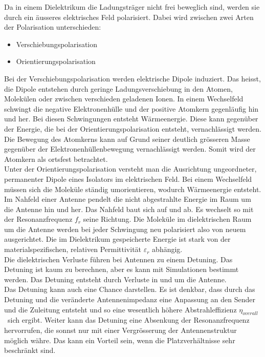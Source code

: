 Da in einem Dielektrikum die Ladungsträger nicht frei beweglich sind, werden sie durch ein äusseres elektrisches Feld polarisiert. Dabei wird zwischen zwei Arten der Polarisation unterschieden:
\begin{itemize}
\item Verschiebungspolarisation
\item Orientierungspolarisation
\end{itemize}

Bei der Verschiebungspolarisation werden elektrische Dipole  induziert. Das heisst,  die Dipole entstehen durch geringe Ladungsverschiebung in den Atomen, Molekülen oder zwischen verschieden geladenen Ionen. In einem Wechselfeld schwingt die negative Elektronenhülle und der positive Atomkern gegenläufig hin und her.  Bei diesen Schwingungen entsteht  Wärmeenergie.  Diese kann gegenüber der Energie, die bei der Orientierungspolarisation entsteht,  vernachlässigt werden.  Die Bewegung des Atomkerns kann auf Grund seiner deutlich grösseren Masse  gegenüber der Elektronenhüllenbewegung vernachlässigt werden. Somit wird der Atomkern als ortsfest betrachtet. \\

Unter der Orientierungspolarisation versteht man die Ausrichtung ungeordneter, permanenter Dipole eines Isolators im elektrischen Feld. Bei einem Wechselfeld müssen sich die Moleküle ständig umorientieren, wodurch Wärmeenergie entsteht\cite{DielektrikumPolarisation}.\\

Im Nahfeld einer Antenne pendelt die nicht abgestrahlte Energie im Raum um die Antenne hin und her. Das Nahfeld baut sich auf und ab. Es wechselt so mit der Resonanzfrequenz $f_{r}$ seine Richtung. Die Moleküle im dielektrischen Raum um die Antenne werden bei jeder Schwingung neu polarisiert also von neuem ausgerichtet.
Die im Dielektrikum gespeicherte Energie ist stark von der materialspezifischen, relativen Permittivität $\varepsilon_r $ abhängig.\\

Die dielektrischen Verluste führen bei Antennen  zu einem Detuning. Das Detuning ist kaum zu berechnen, aber es kann mit Simulationen bestimmt werden. Das Detuning entsteht durch Verluste in und um die  Antenne.\\ 
Das Detuning kann auch eine Chance darstellen. Es ist denkbar, dass durch das Detuning und die veränderte Antennenimpedanz eine Anpassung an den Sender und die Zuleitung entsteht und so eine wesentlich höhere Abstrahleffizienz $\eta_{overall}$ \ sich ergibt. Weiter kann das Detuning eine Absenkung der Resonanzfrequenz hervorrufen, die sonnst nur mit einer Vergrösserung der Antennenstruktur möglich währe. Das kann ein Vorteil sein, wenn die Platzverhältnisse sehr beschränkt sind.


